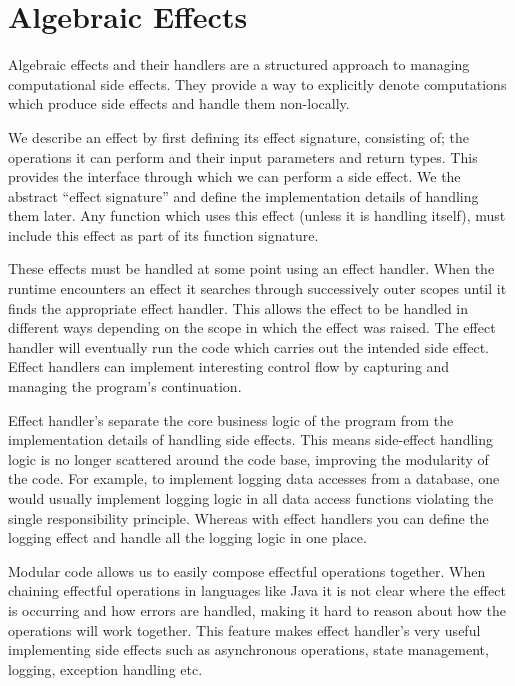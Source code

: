 \documentclass[logo,bsc,singlespacing,parskip]{infthesis}
\begin{document}
\section{Algebraic Effects}

Algebraic effects \cite{plotkin_handling_2013} and their handlers \cite{pretnar_introduction_2015} are a structured approach to managing computational side effects. They provide a way to explicitly denote computations which produce side effects and handle them non-locally.

We describe an effect by first defining its effect signature, consisting of; the operations it can perform and their input parameters and return types. This provides the interface through which we can perform a side effect. We the abstract “effect signature” and define the implementation details of handling them later. Any function which uses this effect (unless it is handling itself), must include this effect as part of its function signature. 

These effects must be handled at some point using an effect handler. When the runtime encounters an effect it searches through successively outer scopes until it finds the appropriate effect handler. This allows the effect to be handled in different ways depending on the scope in which the effect was raised. The effect handler will eventually run the code which carries out the intended side effect. Effect handlers can implement interesting control flow by capturing and managing the program’s continuation.

Effect handler’s separate the core business logic of the program from the implementation details of handling side effects. This means side-effect handling logic is no longer scattered around the code base, improving the modularity of the code. 
For example, to implement logging data accesses from a database, one would usually implement logging logic in all data access functions violating the single responsibility principle. Whereas with effect handlers you can define the logging effect and handle all the logging logic in one place. 

Modular code allows us to easily compose effectful operations together. When chaining effectful operations in languages like Java it is not clear where the effect is occurring and how errors are handled, making it hard to reason about how the operations will work together. This feature makes effect handler’s very useful implementing side effects such as asynchronous operations, state management, logging, exception handling etc. 
\end{document}
